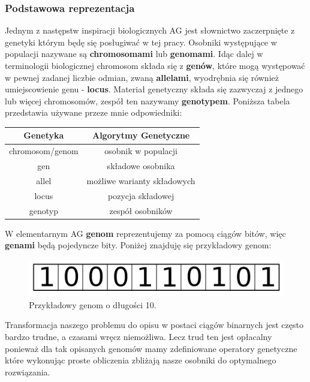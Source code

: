\documentclass{article}
\begin{document}
\subsubsection{Podstawowa reprezentacja}
Jednym z następstw inspiracji biologicznych AG jest słownictwo zaczerpnięte 
z genetyki którym będę się posługiwać w tej pracy.
Osobniki występujące w populacji nazywane są \textbf{chromosomami} lub \textbf{genomami}.
Idąc dalej w terminologii biologicznej chromosom składa się z \textbf{genów}, które mogą
występować w pewnej zadanej liczbie odmian, zwaną \textbf{allelami}, wyodrębnia się również
umiejscowienie genu - \textbf{locus}.
Materiał genetyczny składa się zazwyczaj z jednego lub więcej chromosomów, zespół ten nazywamy
\textbf{genotypem}\cite{goldberg}.
Poniższa tabela przedstawia używane przeze mnie odpowiedniki:
\begin{center}
\begin{tabular}{|c|c|}
	\hline
	Genetyka & Algorytmy Genetyczne\\
	\hline
	chromosom/genom & osobnik w populacji\\
	gen & składowe osobnika\\
	allel & możliwe warianty składowych\\
	locus & pozycja składowej\\
	genotyp & zespół osobników\\
	\hline
\end{tabular}
\end{center}

W elementarnym AG \textbf{genom} reprezentujemy za pomocą ciągów bitów, więc \textbf{genami}
będą pojedyncze bity.
Poniżej znajduję się przykładowy genom:\\

\begin{figure}[H]
\centering
\includegraphics[scale=0.20]{genome_v2.png}
\caption{Przykładowy genom o długości 10.}
\end{figure}

Transformacja naszego problemu do opisu w postaci ciągów binarnych jest często bardzo trudne, a
czasami wręcz niemożliwa. Lecz trud ten jest opłacalny ponieważ dla tak opisanych genomów mamy
zdefiniowane operatory genetyczne które wykonując proste obliczenia zbliżają nasze osobniki do
optymalnego rozwiązania.
\end{document}
